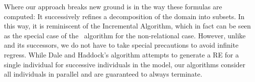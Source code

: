 

Where our approach breaks new ground is in the way these formulas
are computed: It successively
refines a decomposition of the domain into subsets.  In this way, it
is reminiscent of the Incremental Algorithm, which in fact can be seen
as the special case of the \el\ algorithm for the non-relational case.
However, unlike
 and its successors,
we do not have to take special precautions to avoid infinite regress. While Dale
and Haddock's algorithm attempts to generate a RE for a single
individual for successive individuals in the model, our algorithms
consider all individuals in parallel and are guaranteed to always terminate.









